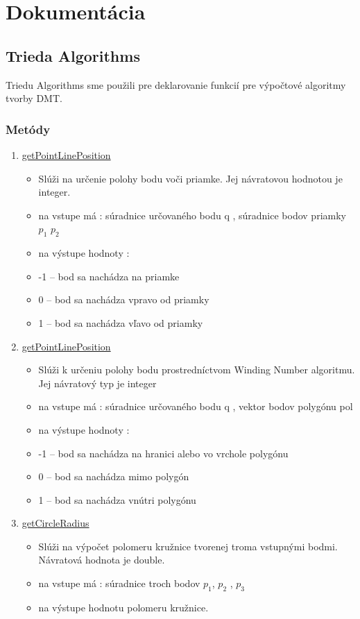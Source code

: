 \documentclass[12pt]{article}
\begin{document}

\section{Dokumentácia}
\subsection{Trieda Algorithms}
Triedu Algorithms sme použili pre deklarovanie funkcií pre výpočtové algoritmy tvorby DMT.

\subsubsection{Metódy}
\begin{enumerate}
\item[] \underline{getPointLinePosition}
\begin{itemize}
\item Slúži na určenie polohy bodu voči priamke. Jej návratovou hodnotou je integer.
\item na vstupe má : súradnice určovaného bodu q , súradnice bodov priamky $p_1$ $p_2$
\item na výstupe hodnoty :
\item[] -1 – bod sa nachádza na priamke
\item[] 0 – bod sa nachádza vpravo od priamky
\item[] 1 – bod sa nachádza vľavo od priamky
\end{itemize}

\item[] \underline{getPointLinePosition}
\begin{itemize}
\item Slúži k určeniu polohy bodu prostredníctvom Winding Number algoritmu. Jej návratový typ je integer
\item na vstupe má : súradnice určovaného bodu q , vektor bodov polygónu pol
\item na výstupe hodnoty :
\item[] -1 – bod sa nachádza na hranici alebo vo vrchole polygónu
\item[] 0 – bod sa nachádza mimo polygón
\item[] 1 – bod sa nachádza vnútri polygónu
\end{itemize}

\item[] \underline{getCircleRadius}
\begin{itemize}
\item Slúži na výpočet polomeru kružnice tvorenej troma vstupnými bodmi. Návratová hodnota je double.
\item na vstupe má : súradnice troch bodov $p_1$, $p_2$ , $p_3$
\item na výstupe hodnotu polomeru kružnice.
\end{itemize}


\end{enumerate}
\end{document}
